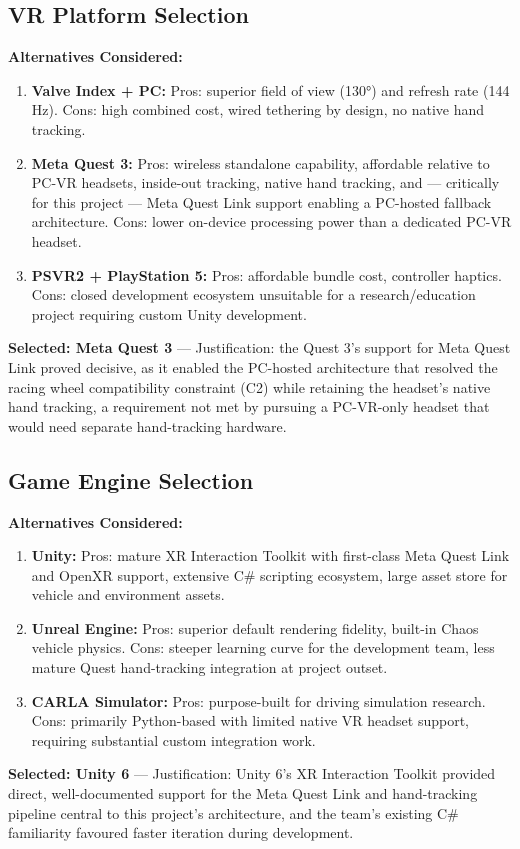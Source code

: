 \subsection{VR Platform Selection}
\textbf{Alternatives Considered:}
\begin{enumerate}
    \item \textbf{Valve Index + PC:} Pros: superior field of view (130°) and refresh rate (144 Hz). Cons: high combined cost, wired tethering by design, no native hand tracking.
    \item \textbf{Meta Quest 3:} Pros: wireless standalone capability, affordable relative to PC-VR headsets, inside-out tracking, native hand tracking, and — critically for this project — Meta Quest Link support enabling a PC-hosted fallback architecture. Cons: lower on-device processing power than a dedicated PC-VR headset.
    \item \textbf{PSVR2 + PlayStation 5:} Pros: affordable bundle cost, controller haptics. Cons: closed development ecosystem unsuitable for a research/education project requiring custom Unity development.
\end{enumerate}
\textbf{Selected: Meta Quest 3} — Justification: the Quest 3's support for Meta Quest Link proved decisive, as it enabled the PC-hosted architecture that resolved the racing wheel compatibility constraint (C2) while retaining the headset's native hand tracking, a requirement not met by pursuing a PC-VR-only headset that would need separate hand-tracking hardware.

\subsection{Game Engine Selection}
\textbf{Alternatives Considered:}
\begin{enumerate}
    \item \textbf{Unity:} Pros: mature XR Interaction Toolkit with first-class Meta Quest Link and OpenXR support, extensive C\# scripting ecosystem, large asset store for vehicle and environment assets.
    \item \textbf{Unreal Engine:} Pros: superior default rendering fidelity, built-in Chaos vehicle physics. Cons: steeper learning curve for the development team, less mature Quest hand-tracking integration at project outset.
    \item \textbf{CARLA Simulator:} Pros: purpose-built for driving simulation research. Cons: primarily Python-based with limited native VR headset support, requiring substantial custom integration work.
\end{enumerate}
\textbf{Selected: Unity 6} — Justification: Unity 6's XR Interaction Toolkit provided direct, well-documented support for the Meta Quest Link and hand-tracking pipeline central to this project's architecture, and the team's existing C\# familiarity favoured faster iteration during development.

